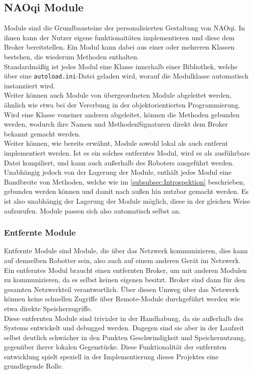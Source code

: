 \subsection{NAOqi Module}\label{subsec:NAOqiModule}
Module sind die Grundbausteine der personalisierten Gestaltung von NAOqi. In ihnen kann der Nutzer eigene funktionaitäten implementieren und diese dem Broker bereitstellen. Ein Modul kann dabei aus einer oder mehreren Klassen bestehen, die wiederum Methoden enthalten.\\
Standardmäßig ist jedes Modul eine Klasse innerhalb einer Bibliothek, welche über eine \texttt{autoload.ini}-Datei geladen wird, worauf die Modulklasse automatisch instanziiert wird.\\
Weiter können auch Module von übergeordneten Module abgeleitet werden, ähnlich wie etwa bei der Vererbung in der objektorientierten Programmierung. Wird eine Klasse voneiner anderen abgeleitet, können die Methoden gebunden werden, wodurch ihre Namen und MethodenSignaturen direkt dem Broker bekannt gemacht werden.\\
Weiter können, wie bereits erwähnt, Module sowohl lokal als auch entfernt implementiert werden. Ist es ein solches entferntes Modul, wird es als ausführbare Datei kompiliert, und kann auch außerhalb des Roboters ausgeführt werden.\\
Unabhängig jedoch von der Lagerung der Module, enthält jedes Modul eine Bandbreite von Methoden, welche wie im \autoref{subsubsec:Introspektion} beschrieben, gebunden werden können und damit nach außen hin nutzbar gemacht werden. Es ist also unabhängig der Lagerung der Module möglich, diese in der gleichen Weise aufzurufen. Module passen sich also automatisch selbst an.\\

\subsubsection{Entfernte Module}\label{subsubsec:EntfernteModule}
Entfernte Module sind Module, die über das Netzwerk kommunizieren, dies kann auf demselben Robotter sein, also auch auf einem anderen Gerät im Netzwerk. Ein entferntes Modul braucht einen entfernten Broker, um mit anderen Modulen zu kommunizieren, da es selbst keinen eigenen besitzt. Broker sind dann für den gesamten Netzwerkteil verantwortlich. Über diesen Umweg über das Netzwerk können keine schnellen Zugriffe über Remote-Module durchgeführt werden wie etwa direkte Speicherzugriffe.\\
Diese entfernten Module sind trivialer in der Handhabung, da sie außerhalb des Systems entwickelt und debugged werden. Dagegen sind sie aber in der Laufzeit selbst deutlich schwächer in den Punkten Geschwindigkeit und Speichernutzung, gegenüber iherer lokalen Gegenstücke. Diese Funktionalität der entfernten entwicklung spielt speziell in der Implementierung dieses Projektes eine grundlegende Rolle.\\

